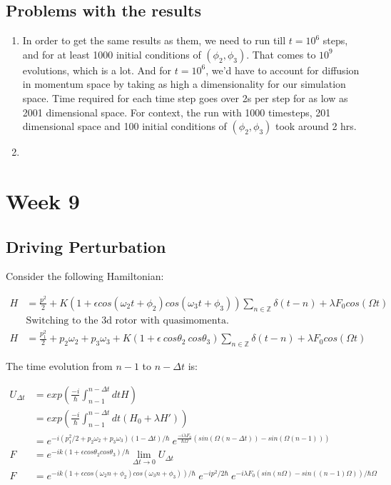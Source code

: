 \documentclass[12pt]{article}
\begin{document}
\subsection{Problems with the results}
\begin{enumerate}
    \item In order to get the same results as them, we need to run till
    $t = 10^6$ steps, and for at least 1000 initial conditions of
    $(\phi_2, \phi_3)$. That comes to $10^9$ evolutions, which is a lot.
    And for $t = 10^6$, we'd have to account for diffusion in momentum space by
    taking as high a dimensionality for our simulation space. Time required for
    each time step goes over 2s per step for as low as 2001 dimensional space.
    For context, the run with 1000 timesteps, 201 dimensional space and 100
    initial conditions of $(\phi_2,\phi_3)$ took around 2 hrs.

    \item
\end{enumerate}

\section{Week 9}
\subsection{Driving Perturbation}
Consider the following Hamiltonian:

\begin{align}
    H &= \frac{p^2}{2}
    + K (1 + \epsilon cos(\omega_2 t + \phi_2) cos(\omega_3 t + \phi_3))
    \sum_{n \in \mathbb{Z}} \delta(t - n) + \lambda F_0 cos(\Omega t) \\
    &\text{Switching to the 3d rotor with quasimomenta.} \\
    H &= \frac{p_1^2}{2} + p_2 \omega_2 + p_3 \omega_3
    + K (1 + \epsilon \ cos\theta_2 \ cos\theta_3)
    \sum_{n \in \mathbb{Z}} \delta(t - n) + \lambda F_0 cos(\Omega t)
\end{align}

The time evolution from $n-1$ to $n-\Delta t$ is:

\begin{align}
    U_{\Delta t} &= exp(\frac{-i}{\hbar} \int_{n-1}^{n-\Delta t} dt H) \\
    &= exp(\frac{-i}{\hbar}\int_{n-1}^{n-\Delta t} dt (H_0 + \lambda H')) \\
    &= e^{-i (p_1^2/2 + p_2 \omega_2 + p_3 \omega_3)(1 - \Delta t) / \hbar} \
    e^{\frac{-i\lambda F_0}{\hbar \Omega}(sin(\Omega (n - \Delta t)) - sin(\Omega (n-1)))} \\
    F &= e^{-i k(1 + \epsilon cos\theta_2 cos\theta_3) / \hbar} \lim_{\Delta t \to 0} U_{\Delta t} \\
    F &= e^{-i k(1 + \epsilon cos(\omega_2 n + \phi_2) cos(\omega_3 n + \phi_3)) / \hbar} \ e^{-ip^2/2\hbar} \  e^{-i\lambda F_0(sin(n \Omega) - sin((n-1) \Omega )) / \hbar \Omega}
\end{align}
\end{document}
